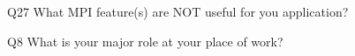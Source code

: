 \begin{description}%
\item{Q27} What MPI feature(s) are NOT useful for you application?%
\item{Q8} What is your major role at your place of work?%
\end{description}%
